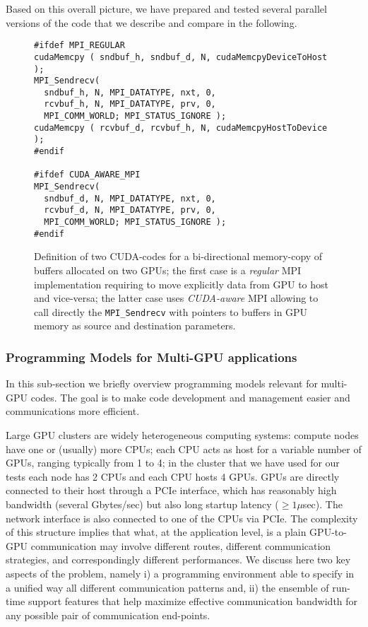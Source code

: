 \documentclass{elsarticle}
\begin{document}
Based on this overall picture, we have prepared and tested several 
parallel versions of the code that we describe and compare in the following.

\begin{figure}
\begin{lstlisting}[basicstyle=\scriptsize]
#ifdef MPI_REGULAR
cudaMemcpy ( sndbuf_h, sndbuf_d, N, cudaMemcpyDeviceToHost );
MPI_Sendrecv(
  sndbuf_h, N, MPI_DATATYPE, nxt, 0,
  rcvbuf_h, N, MPI_DATATYPE, prv, 0,
  MPI_COMM_WORLD; MPI_STATUS_IGNORE );
cudaMemcpy ( rcvbuf_d, rcvbuf_h, N, cudaMemcpyHostToDevice );
#endif

#ifdef CUDA_AWARE_MPI
MPI_Sendrecv(
  sndbuf_d, N, MPI_DATATYPE, nxt, 0,
  rcvbuf_d, N, MPI_DATATYPE, prv, 0,
  MPI_COMM_WORLD; MPI_STATUS_IGNORE );
#endif
\end{lstlisting}
\caption{Definition of two CUDA-codes for a bi-directional memory-copy 
of buffers allocated on two GPUs; the first case is a {\em regular} MPI 
implementation requiring to move explicitly data from GPU to host and 
vice-versa; the latter case uses {\em CUDA-aware} MPI allowing to call  
directly the {\tt MPI\_Sendrecv} with pointers to buffers in GPU memory 
as source and destination parameters.}
\label{cuda-example}
\end{figure}


\subsubsection*{Programming Models for Multi-GPU applications}

In this sub-section we briefly overview programming models relevant for 
multi-GPU codes. The goal is to make code development and management 
easier and communications more efficient.  

Large GPU clusters are widely heterogeneous computing systems: compute nodes 
have one or (usually) more CPUs; each CPU acts as host for a variable number 
of GPUs, ranging typically from 1 to 4; in the cluster that we have used for our 
tests each node has 2 CPUs and each CPU hosts 4 GPUs. GPUs are directly connected 
to their host through a PCIe interface, which has reasonably high bandwidth 
(several Gbytes/sec) but also long startup latency ($\ge 1 \mu$sec). 
%
The network interface is also connected to one of the CPUs via PCIe.
% 
The complexity of this structure implies that what, at the application level, 
is a plain GPU-to-GPU communication may involve different routes, different 
communication strategies, and correspondingly different performances. 
%
We discuss here two key aspects of the problem, namely i) a programming 
environment able to specify in a unified way all different communication 
patterns and, ii) the ensemble of run-time support features that help 
maximize effective communication bandwidth for any possible pair of 
communication end-points.
\end{document}

